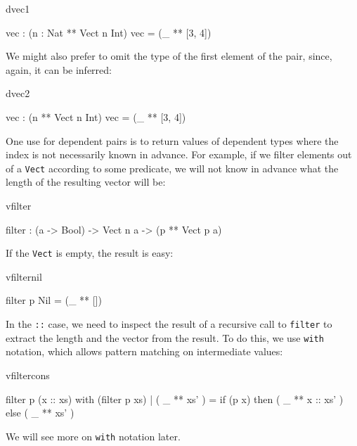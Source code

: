 \begin{SaveVerbatim}{dvec1}

vec : (n : Nat ** Vect n Int)
vec = (_ ** [3, 4])

\end{SaveVerbatim}

\noindent
We might also prefer to omit the type of the first element of the pair, since,
again, it can be inferred:

\begin{SaveVerbatim}{dvec2}

vec : (n ** Vect n Int)
vec = (_ ** [3, 4])

\end{SaveVerbatim}

\noindent
One use for dependent pairs is to return values of dependent types where the
index is not necessarily known in advance. For example, if we filter elements
out of a \texttt{Vect} according to some predicate, we will not know in advance what the
length of the resulting vector will be:

\begin{SaveVerbatim}{vfilter}

filter : (a -> Bool) -> Vect n a -> (p ** Vect p a)

\end{SaveVerbatim}

\noindent
If the \texttt{Vect} is empty, the result is easy:

\begin{SaveVerbatim}{vfilternil}

filter p Nil = (_ ** [])

\end{SaveVerbatim}

\noindent
In the \texttt{::} case, we need to inspect the result of a recursive call to 
\texttt{filter} to
extract the length and the vector from the result. To do this, we use \texttt{with}
notation, which allows pattern matching on intermediate values:

\begin{SaveVerbatim}{vfiltercons}

filter p (x :: xs) with (filter p xs)
  | ( _ ** xs' ) = if (p x) then ( _ ** x :: xs' ) else ( _ ** xs' )

\end{SaveVerbatim}

\noindent
We will see more on \texttt{with} notation later.

